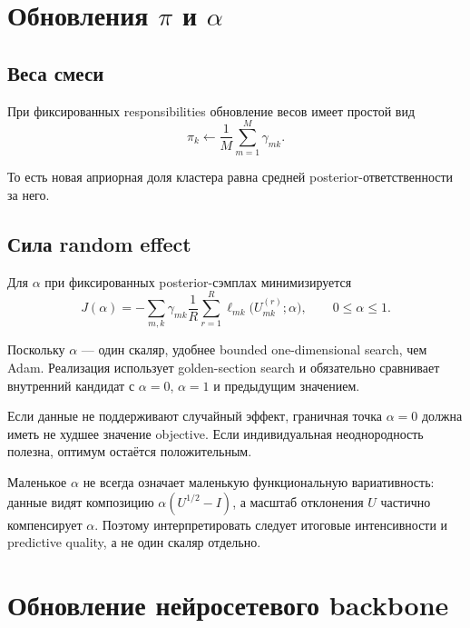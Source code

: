 \documentclass[12pt,a4paper]{article}
\newenvironment{warningbox}{\par\medskip\noindent{\color{red}\bfseries Важно не перепутать. }\ignorespaces}{\par\medskip}
\begin{document}
\section{Обновления \texorpdfstring{\(\pi\)}{pi} и \texorpdfstring{\(\alpha\)}{alpha}}

\subsection{Веса смеси}

При фиксированных responsibilities обновление весов имеет простой вид
\begin{equation}
\pi_k\leftarrow\frac{1}{M}\sum_{m=1}^{M}\gamma_{mk}.
\end{equation}

То есть новая априорная доля кластера равна средней posterior-ответственности за него.

\subsection{Сила random effect}

Для \(\alpha\) при фиксированных posterior-сэмплах минимизируется
\begin{equation}
J(\alpha)=-\sum_{m,k}\gamma_{mk}\frac{1}{R}\sum_{r=1}^{R}\ell_{mk}\bigl(U_{mk}^{(r)};\alpha\bigr),\qquad 0\leq\alpha\leq1.
\label{eq:alpha-objective}
\end{equation}

Поскольку \(\alpha\) --- один скаляр, удобнее bounded one-dimensional search, чем Adam. Реализация использует golden-section search и обязательно сравнивает внутренний кандидат с \(\alpha=0\), \(\alpha=1\) и предыдущим значением.

Если данные не поддерживают случайный эффект, граничная точка \(\alpha=0\) должна иметь не худшее значение objective. Если индивидуальная неоднородность полезна, оптимум остаётся положительным.

\begin{warningbox}
Маленькое \(\alpha\) не всегда означает маленькую функциональную вариативность: данные видят композицию \(\alpha(U^{1/2}-I)\), а масштаб отклонения \(U\) частично компенсирует \(\alpha\). Поэтому интерпретировать следует итоговые интенсивности и predictive quality, а не один скаляр отдельно.
\end{warningbox}

\section{Обновление нейросетевого backbone}
\end{document}
